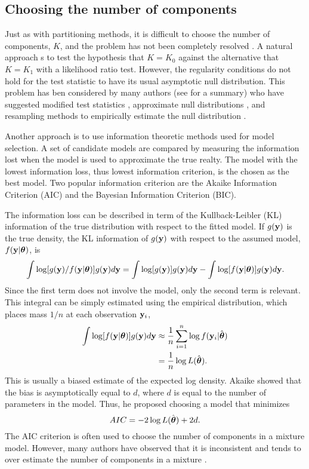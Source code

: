 \subsection{Choosing the number of components}
Just as with partitioning methods, it is difficult to choose the number of components, $K$, and the problem has not been completely resolved \cite{mclachlan2000}. A natural approach s to test the hypothesis that $K=K_{0}$ against the alternative that $K=K_{1}$ with a likelihood ratio test. However, the regularity conditions do not hold for the test statistic to have its usual asymptotic null distribution. This problem has ben considered by many authors (see \textcite{mclachlan2000} for a summary) who have suggested modified test statistics \cite{wolfe1971}, approximate null distributions \cite{lo2001}, and resampling methods to empirically estimate the null distribution \cite{mclachlan1987}.

Another approach is to use information theoretic methods used for model selection. A set of candidate models are compared by measuring the information lost when the model is used to approximate the true realty. The model with the lowest information loss, thus lowest information criterion, is the chosen as the best model. Two popular information criterion are the Akaike Information Criterion (AIC) and the Bayesian Information Criterion (BIC). 

The information loss can be described in term of the Kullback-Leibler (KL) information \cite{kullback1951} of the true distribution with respect to the fitted model. If $g(\mathbf y)$ is the true density, the KL information of $g(\mathbf y)$ with respect to the assumed model, $f(\mathbf y|\boldsymbol \theta)$, is
$$\int \log[g(\mathbf y)/f(\mathbf y|\boldsymbol\theta)]g(\mathbf y)d\mathbf y=\int \log[g(\mathbf y)]g(\mathbf y)d\mathbf y-\int \log[f(\mathbf y|\boldsymbol\theta)]g(\mathbf y)d\mathbf y.$$
Since the first term does not involve the model, only the second term is relevant. This integral can be simply estimated using the empirical distribution, which places mass $1/n$ at each observation $\mathbf y_{i}$,
\begin{align*}
\int \log[f(\mathbf y|\boldsymbol\theta)]g(\mathbf y)d\mathbf y &\approx \frac{1}{n} \sum^{n}_{i=1}\log f(\mathbf y_{i}|\hat{\boldsymbol\theta})\\
&=\frac{1}{n} \log L(\hat{\boldsymbol\theta}).
\end{align*}
This is usually a biased estimate of the expected log density. Akaike \cite{akaike1973,akaike1974} showed that the bias is asymptotically equal to $d$, where $d$ is equal to the number of parameters in the model. Thus, he proposed choosing a model that minimizes
$$AIC = -2\log L(\hat{\boldsymbol\theta}) + 2d.$$
The AIC criterion is often used to choose the number of components in a mixture model. However, many authors have observed that it is inconsistent \cite{koehler1988} and tends to over estimate the number of components in a mixture \cite{soromenho1994,celeux1996}.

